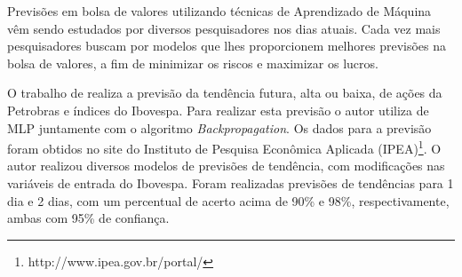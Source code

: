 \documentclass[12pt,a4paper,utf8]{ppgsi}
\begin{document}
Previsões em bolsa de valores utilizando técnicas de Aprendizado de Máquina vêm sendo estudados por diversos pesquisadores nos dias atuais. Cada vez mais pesquisadores buscam por modelos que lhes proporcionem melhores previsões na bolsa de valores, a fim de minimizar os riscos e maximizar os lucros.

O trabalho de \citep{de2006uso} realiza a previsão da tendência futura, alta ou baixa, de ações da Petrobras e índices do Ibovespa. Para realizar esta previsão o autor utiliza de MLP juntamente com o algoritmo \textit{Backpropagation}. Os dados para a previsão foram obtidos no site do Instituto de Pesquisa Econômica Aplicada (IPEA)\footnote{http://www.ipea.gov.br/portal/}. O autor realizou diversos modelos de previsões de tendência, com modificações nas variáveis de entrada do Ibovespa. Foram realizadas previsões de tendências para 1 dia e 2 dias, com um percentual de acerto acima de 90\% e 98\%, respectivamente, ambas com 95\% de confiança.


\end{document}
